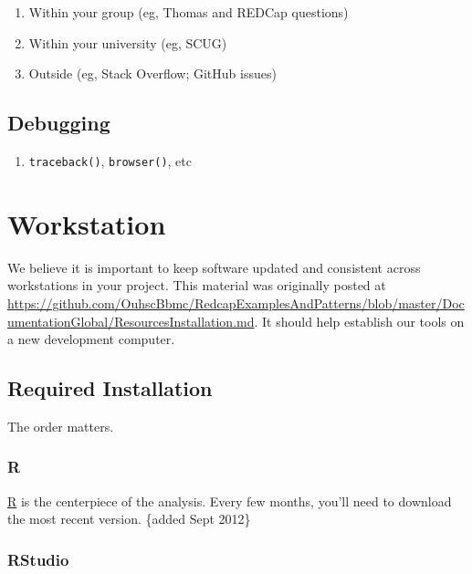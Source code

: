 \documentclass[
]{book}
\providecommand{\tightlist}{%
  \setlength{\itemsep}{0pt}\setlength{\parskip}{0pt}}
\begin{document}
\begin{enumerate}
\def\labelenumi{\arabic{enumi}.}
\tightlist
\item
  Within your group (eg, Thomas and REDCap questions)
\item
  Within your university (eg, SCUG)
\item
  Outside (eg, Stack Overflow; GitHub issues)
\end{enumerate}

\hypertarget{debugging}{%
\section{Debugging}\label{debugging}}

\begin{enumerate}
\def\labelenumi{\arabic{enumi}.}
\tightlist
\item
  \texttt{traceback()}, \texttt{browser()}, etc
\end{enumerate}

\hypertarget{workstation}{%
\chapter{Workstation}\label{workstation}}

We believe it is important to keep software updated and consistent across workstations in your project. This material was originally posted at \url{https://github.com/OuhscBbmc/RedcapExamplesAndPatterns/blob/master/DocumentationGlobal/ResourcesInstallation.md}. It should help establish our tools on a new development computer.

\hypertarget{installation-required}{%
\section{Required Installation}\label{installation-required}}

The order matters.

\hypertarget{r}{%
\subsection{R}\label{r}}

\href{http://cran.r-project.org/}{R} is the centerpiece of the analysis. Every few months, you'll need to download the most recent version. \{added Sept 2012\}

\hypertarget{rstudio}{%
\subsection{RStudio}\label{rstudio}}
\end{document}
